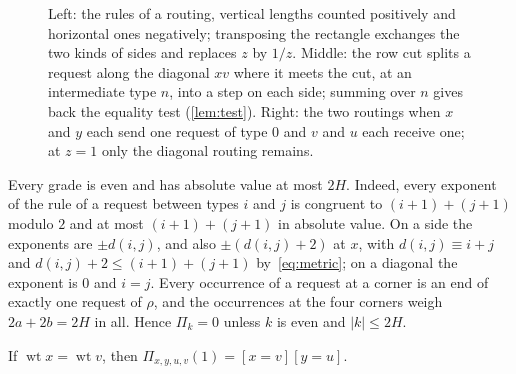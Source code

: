 \documentclass[11pt]{article}
\theoremstyle{definition}
\theoremstyle{definition}
\theoremstyle{remark}
\newcommand{\wt}{\operatorname{wt}}
\begin{document}
\begin{figure}[htb]
\caption{Left: the rules of a routing, vertical lengths counted positively and horizontal ones negatively; transposing the rectangle exchanges the two kinds of sides and replaces $z$ by $1/z$. Middle: the row cut splits a request along the diagonal $xv$ where it meets the cut, at an intermediate type $n$, into a step on each side; summing over $n$ gives back the equality test (\cref{lem:test}). Right: the two routings when $x$ and $y$ each send one request of type $0$ and $v$ and $u$ each receive one; at $z=1$ only the diagonal routing remains.}
\label{fig:rules}
\end{figure}

Every grade is even and has absolute value at most $2H$. Indeed, every exponent of the rule of a request between types $i$ and $j$ is congruent to $(i+1)+(j+1)$ modulo $2$ and at most $(i+1)+(j+1)$ in absolute value. On a side the exponents are $\pm d(i,j)$, and also $\pm(d(i,j)+2)$ at $x$, with $d(i,j)\equiv i+j$ and $d(i,j)+2\le(i+1)+(j+1)$ by~\eqref{eq:metric}; on a diagonal the exponent is $0$ and $i=j$. Every occurrence of a request at a corner is an end of exactly one request of $\rho$, and the occurrences at the four corners weigh $2a+2b=2H$ in all. Hence $\Pi_k=0$ unless $k$ is even and $|k|\le2H$.

\begin{lemma}\label{lem:atone}
If $\wt x=\wt v$, then $\Pi_{x,y,u,v}(1)=[x=v][y=u]$.
\end{lemma}
\end{document}
